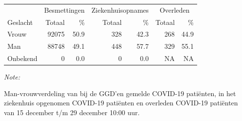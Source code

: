\documentclass[
  english,
  man,floatsintext]{apa6}
\begin{document}
\begin{table}
\centering\begingroup\fontsize{11}{13}\selectfont

\begin{threeparttable}
\begin{tabular}{lrrrrrr}
\toprule
\multicolumn{1}{c}{ } & \multicolumn{2}{c}{Besmettingen} & \multicolumn{2}{c}{Ziekenhuisopnames} & \multicolumn{2}{c}{Overleden} \\
\cmidrule(l{3pt}r{3pt}){2-3} \cmidrule(l{3pt}r{3pt}){4-5} \cmidrule(l{3pt}r{3pt}){6-7}
Geslacht & Totaal & \% & Totaal & \% & Totaal & \%\\
\midrule
Vrouw & 92075 & 50.9 & 328 & 42.3 & 268 & 44.9\\
Man & 88748 & 49.1 & 448 & 57.7 & 329 & 55.1\\
Onbekend & 0 & 0.0 & 0 & 0.0 & NA & NA\\
\bottomrule
\end{tabular}
\begin{tablenotes}
\item \textit{Note: } 
\item Man-vrouwverdeling van bij de GGD’en gemelde COVID-19 patiënten, in het ziekenhuis opgenomen COVID-19 patiënten en overleden COVID-19 patiënten van 15 december t/m 29 december 10:00 uur.
\end{tablenotes}
\end{threeparttable}
\endgroup{}
\end{table}
\newpage
\end{document}
